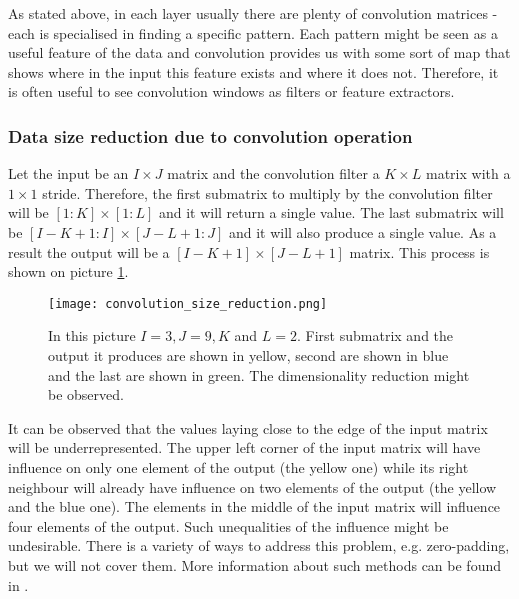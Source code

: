 \documentclass[a4paper,10pt]{report}
\begin{document}
	  
	  As stated above, in each layer usually there are plenty of convolution matrices - each is specialised in finding a specific pattern. Each pattern might be seen as a useful feature of the data and convolution provides us with some sort of map that shows where in the input this feature exists and where it does not. Therefore, it is often useful to see convolution windows as filters or feature extractors.\\
	  
	  \subsubsection{Data size reduction due to convolution operation}
	  
 	  Let the input be an $I\times J$ matrix and the convolution filter a $K\times L$ matrix with a $1\times1$ stride. Therefore, the first submatrix to multiply by the convolution filter will be $[1:K]\times[1:L]$ and it will return a single value. The last submatrix will be $[I-K+1:I]\times[J-L+1:J]$ and it will also produce a  single value. As a result the output will be a $[I-K+1]\times[J-L+1]$ matrix. This process is shown on picture \ref{fig:convolution_size_reduction}.\\
	  
	  
	  \begin{figure}[h!]
	    \centering
	    \texttt{[image: convolution\_size\_reduction.png]}
	    \caption{In this picture $I = 3, J = 9, K$ and $L = 2$. First submatrix and the output it produces are shown in yellow, second are shown in blue and the last are shown in green. The dimensionality reduction might be observed.}
	    \label{fig:convolution_size_reduction}
	  \end{figure} 
	  
	  It can be observed that the values laying close to the edge of the input matrix will be underrepresented. The upper left corner of the input matrix will have influence on only one element of the output (the yellow one) while its right neighbour will already have influence on two elements of the output (the yellow and the blue one). The elements in the middle of the input matrix will influence four elements of the output. Such unequalities of the influence might be undesirable. There is a variety of ways to address this problem, e.g. zero-padding, but we will not cover them. More information about such methods can be found in \cite{BENGIOBOOK}.\\
	  
\end{document}
